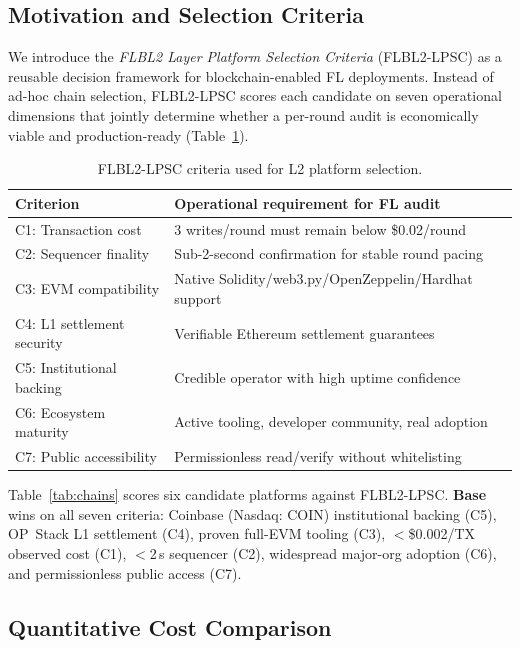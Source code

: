 \documentclass{llncs}
\begin{document}
\subsection{Motivation and Selection Criteria}
We introduce the \emph{FLBL2 Layer Platform Selection Criteria} (FLBL2-LPSC)
as a reusable decision framework for blockchain-enabled FL deployments.
Instead of ad-hoc chain selection, FLBL2-LPSC scores each candidate on seven
operational dimensions that jointly determine whether a per-round audit is
economically viable and production-ready (Table~\ref{tab:lpsc_criteria}).

\begin{table}[t]
\caption{FLBL2-LPSC criteria used for L2 platform selection.}
\label{tab:lpsc_criteria}
\centering\footnotesize
\setlength{\tabcolsep}{4pt}
\begin{tabular}{ll}
\toprule
\textbf{Criterion} & \textbf{Operational requirement for FL audit} \\
\midrule
C1: Transaction cost & 3 writes/round must remain below \$0.02/round \\
C2: Sequencer finality & Sub-2-second confirmation for stable round pacing \\
C3: EVM compatibility & Native Solidity/web3.py/OpenZeppelin/Hardhat support \\
C4: L1 settlement security & Verifiable Ethereum settlement guarantees \\
C5: Institutional backing & Credible operator with high uptime confidence \\
C6: Ecosystem maturity & Active tooling, developer community, real adoption \\
C7: Public accessibility & Permissionless read/verify without whitelisting \\
\bottomrule
\end{tabular}
\end{table}

Table~\ref{tab:chains} scores six candidate platforms against FLBL2-LPSC.
\textbf{Base} wins on all seven criteria: Coinbase (Nasdaq: COIN) institutional backing
(C5), OP~Stack L1 settlement (C4), proven full-EVM tooling (C3),
$<$\$0.002/TX observed cost (C1), $<$2\,s sequencer (C2),
widespread major-org adoption (C6), and permissionless public access (C7).

\subsection{Quantitative Cost Comparison}
\end{document}
